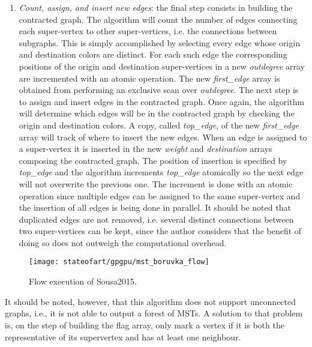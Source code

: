\begin{enumerate}
	\item \emph{Count, assign, and insert new edges}: the final step consists in building the contracted graph.
	The algorithm will count the number of edges connecting each super-vertex to other super-vertices, i.e. the connections between subgraphs.
	This is simply accomplished by selecting every edge whose origin and destination colors are distinct.
	For each such edge the corresponding positions of the origin and destination super-vertices in a new \emph{outdegree} array are incremented with an atomic operation.
	The new \emph{first\_edge} array is obtained from performing an exclusive scan over \emph{outdegree}.
	The next step is to assign and insert edges in the contracted graph.
	Once again, the algorithm will determine which edges will be in the contracted graph by checking the origin and destination colors.
	A copy, called \emph{top\_edge}, of the new \emph{first\_edge} array will track of where to insert the new edges.
	When an edge is assigned to a super-vertex it is inserted in the new \emph{weight} and \emph{destination} arrays composing the contracted graph.
	The position of insertion is specified by \emph{top\_edge} and the algorithm increments \emph{top\_edge} atomically so the next edge will not overwrite the previous one.
	The increment is done with an atomic operation since multiple edges can be assigned to the same super-vertex and the insertion of all edges is being done in parallel.
	It should be noted that duplicated edges are not removed, i.e. several distinct connections between two super-vertices can be kept, since the author considers that the benefit of doing so does not outweigh the computational overhead.
\end{enumerate}

\begin{figure}[hbtp]
\centering
\texttt{[image: stateofart/gpgpu/mst\_boruvka\_flow]}
\caption{Flow execution of Sousa2015.}
\label{fig:mst sousa}
\end{figure}

It should be noted, however, that this algorithm does not support unconnected graphs, i.e., it is not able to output a forest of MSTs.
A solution to that problem is, on the step of building the flag array, only mark a vertex if it is both the representative of its supervertex and has at least one neighbour.

